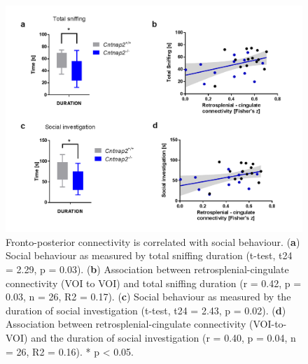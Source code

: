 \begin{figure}[th] 
    \centering
    \includegraphics[scale=0.7]{figures/cntnap2_figure_04.png}
    \decoRule
    \caption[Fronto-posterior connectivity is correlated with social
    behaviour.]{Fronto-posterior connectivity is correlated with social
    behaviour.  (\textbf{a}) Social behaviour as measured by total sniffing
    duration (t-test, t24 = 2.29, p = 0.03). (\textbf{b}) Association between
    retrosplenial-cingulate connectivity (VOI to VOI) and total sniffing
    duration (r = 0.42, p = 0.03, n = 26, R2 = 0.17). (\textbf{c}) Social
    behaviour as measured by the duration of social investigation (t-test, t24 =
    2.43, p = 0.02). (\textbf{d}) Association between retrosplenial-cingulate
    connectivity (VOI-to-VOI) and the duration of social investigation (r =
    0.40, p = 0.04, n = 26, R2 = 0.16). * p < 0.05.}
    \label{fig:cntnap2_fig04}
\end{figure}

